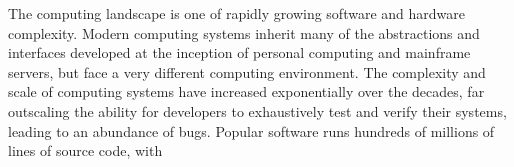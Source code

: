 
The computing landscape is one of rapidly growing software and hardware
complexity.
Modern computing systems inherit many of the abstractions and interfaces
developed at the inception of personal computing and mainframe servers,
but face a very different computing environment.
The complexity and scale of computing systems have increased 
exponentially over the decades, far outscaling the ability for developers to 
exhaustively test and verify their systems, leading to an abundance of bugs.
Popular software runs hundreds of millions of lines of source code, with
